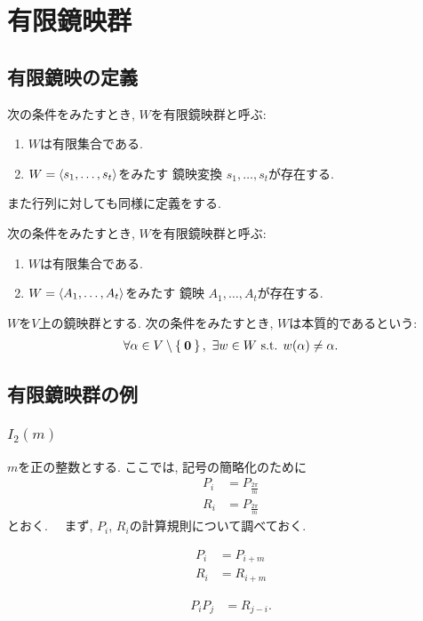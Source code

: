 \chapter{有限鏡映群}

\section{有限鏡映の定義}
\begin{definition}
  次の条件をみたすとき, 
  $W$を有限鏡映群と呼ぶ:
  \begin{enumerate}
  \item $W$は有限集合である.
  \item
    $W=\Braket{s_1,\ldots,s_t}$をみたす
    鏡映変換
    $s_1,\ldots,s_t$が存在する.
  \end{enumerate}
\end{definition}
また行列に対しても同様に定義をする.
\begin{definition}
  次の条件をみたすとき, 
  $W$を有限鏡映群と呼ぶ:
  \begin{enumerate}
  \item $W$は有限集合である.
  \item
    $W=\Braket{A_1,\ldots,A_t}$をみたす
    鏡映
    $A_1,\ldots,A_t$が存在する.
  \end{enumerate}
\end{definition}

\begin{definition}
  $W$を$V$上の鏡映群とする.
  次の条件をみたすとき, 
  $W$は本質的であるという:
  \begin{align*}
    \forall \alpha\in V\setminus\Set{\zzero},\ 
    \exists w\in W
    \text{ s.t. }
    w(\alpha)\neq \alpha.
  \end{align*}
\end{definition}

\section{有限鏡映群の例}

\subsection{$I_2(m)$}
$m$を正の整数とする.
ここでは, 記号の簡略化のために
\begin{align*}
  P_i&=P_{\frac{2\pi}{m}}\\
  R_i&=P_{\frac{2\pi}{m}}
\end{align*}
とおく.
　まず, $P_i$, $R_i$の計算規則について調べておく.
\begin{lemma}
  \begin{align*}
    P_i &= P_{i+m}\\
    R_i &= R_{i+m}
  \end{align*}
\end{lemma}
\begin{lemma}
  \label{lem:i2m:rel:ppr}
  \begin{align*}
    P_i P_j&= R_{j-i}.
  \end{align*}
\end{lemma}

